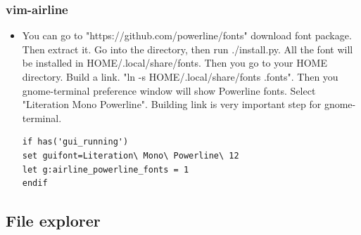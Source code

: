 \documentclass[a4paper,12pt,twoside]{book}
\begin{document}
\subsubsection{vim-airline} 
\begin{itemize}

\item You can go to "https://github.com/powerline/fonts" download font package. Then extract it. Go into the directory, then run ./install.py.  All the font will be installed in HOME/.local/share/fonts. Then you go to your HOME directory. Build a link. "ln -s HOME/.local/share/fonts .fonts". Then you gnome-terminal preference window will show Powerline fonts. Select "Literation Mono Powerline". Building link is very important step for gnome-terminal. 

\begin{verbatim}
if has('gui_running')
set guifont=Literation\ Mono\ Powerline\ 12   
let g:airline_powerline_fonts = 1
endif
\end{verbatim} 
\end{itemize}

\subsection{File explorer}
\end{document}
